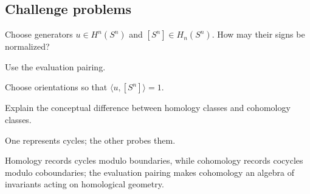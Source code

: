 \subsection*{Challenge problems}

\begin{exercise}\label{exr:viii28-ped-15}
Choose generators $u\in H^n(S^n)$ and $[S^n]\in H_n(S^n)$. How may their signs be normalized?
\end{exercise}
\begin{hint}
Use the evaluation pairing.
\end{hint}
\begin{solution}
Choose orientations so that $\langle u,[S^n]\rangle=1$.
\end{solution}

\begin{exercise}\label{exr:viii28-ped-16}
Explain the conceptual difference between homology classes and cohomology classes.
\end{exercise}
\begin{hint}
One represents cycles; the other probes them.
\end{hint}
\begin{solution}
Homology records cycles modulo boundaries, while cohomology records cocycles modulo coboundaries; the evaluation pairing makes cohomology an algebra of invariants acting on homological geometry.
\end{solution}

